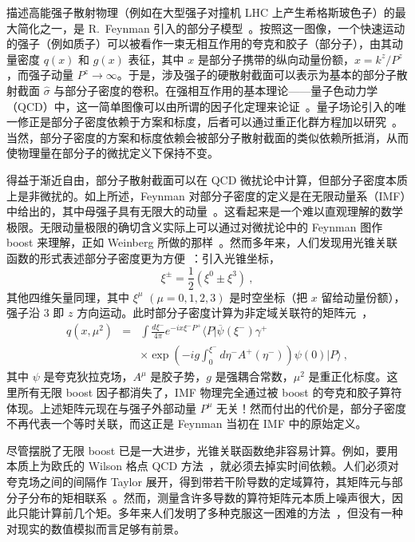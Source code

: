 描述高能强子散射物理（例如在大型强子对撞机 LHC 上产生希格斯玻色子）的最大简化之一，是 R.~Feynman 引入的部分子模型~\cite{Feynman:1969ej}。按照这一图像，一个快速运动的强子（例如质子）可以被看作一束无相互作用的夸克和胶子（部分子），由其动量密度 $q(x)$ 和 $g(x)$ 表征，其中 $x$ 是部分子携带的纵向动量份额，$x= k^z/P^z$，而强子动量 $P^z \rightarrow \infty$。于是，涉及强子的硬散射截面可以表示为基本的部分子散射截面 $\hat \sigma$ 与部分子密度的卷积。在强相互作用的基本理论——量子色动力学（QCD）中，这一简单图像可以由所谓的因子化定理来论证~\cite{Mueller:1989hs,Sterman:1994ce,Collins:2011zzd}。量子场论引入的唯一修正是部分子密度依赖于方案和标度，后者可以通过重正化群方程加以研究~\cite{Altarelli:1977zs}。当然，部分子密度的方案和标度依赖会被部分子散射截面的类似依赖所抵消，从而使物理量在部分子的微扰定义下保持不变。

得益于渐近自由，部分子散射截面可以在 QCD 微扰论中计算，但部分子密度本质上是非微扰的。如上所述，Feynman 对部分子密度的定义是在无限动量系（IMF）中给出的，其中母强子具有无限大的动量~\cite{Feynman:1969ej}。这看起来是一个难以直观理解的数学极限。无限动量极限的确切含义实际上可以通过对微扰论中的 Feynman 图作 boost 来理解，正如 Weinberg 所做的那样~\cite{Weinberg:1966jm}。然而多年来，人们发现用光锥关联函数的形式表述部分子密度更为方便~\cite{Drell:1969ca}：引入光锥坐标，
\begin{equation}
      \xi^\pm = \frac{1}{2}(\xi^0\pm \xi^3) \ ,
\end{equation}
其他四维矢量同理，其中 $\xi^\mu$ $(\mu=0,1,2,3)$ 是时空坐标（把 $x$ 留给动量份额），强子沿 3 即 $z$ 方向运动。此时部分子密度计算为非定域关联符的矩阵元~\cite{Collins:1981uw}，
\begin{eqnarray}
   q(x, \mu^2) &=& \int \frac{d\xi^-}{4\pi} e^{-ix\xi^-P^+}  \langle P|\overline{\psi}(\xi^-)
   \gamma^+ \\
   && \times \exp\left(-ig\int^{\xi^-}_0 d\eta^- A^+(\eta^-) \right)\psi(0) |P\rangle \nonumber \ ,
\end{eqnarray}
其中 $\psi$ 是夸克狄拉克场，$A^\mu$ 是胶子势，$g$ 是强耦合常数，$\mu^2$ 是重正化标度。这里所有无限 boost 因子都消失了，IMF 物理完全通过被 boost 的夸克和胶子算符体现。上述矩阵元现在与强子外部动量 $P^\mu$ 无关！然而付出的代价是，部分子密度不再代表一个等时关联，而这正是 Feynman 当初在 IMF 中的原始定义。

尽管摆脱了无限 boost 已是一大进步，光锥关联函数绝非容易计算。例如，要用本质上为欧氏的 Wilson 格点 QCD 方法~\cite{Wilson:1974sk}，就必须去掉实时间依赖。人们必须对夸克场之间的间隔作 Taylor 展开，得到带若干阶导数的定域算符，其矩阵元与部分子分布的矩相联系~\cite{negele}。然而，测量含许多导数的算符矩阵元本质上噪声很大，因此只能计算前几个矩。多年来人们发明了多种克服这一困难的方法~\cite{Aglietti:1998mz,Liu:1999ak,Detmold:2005gg}，但没有一种对现实的数值模拟而言足够有前景。

